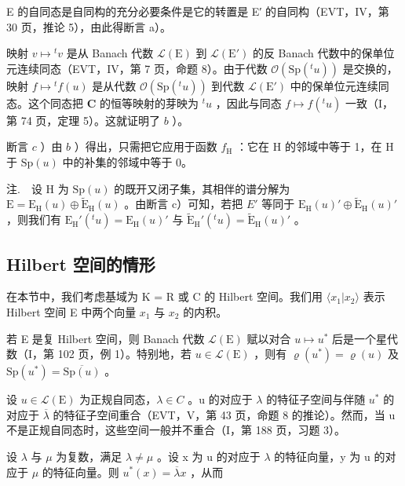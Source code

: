 E 的自同态是自同构的充分必要条件是它的转置是 E′ 的自同构（EVT，IV，第 30 页，推论 5），由此得断言 a）。

映射 \(v \mapsto {}^t v\) 是从 Banach 代数 \(\mathcal{L}(\mathrm{E})\) 到 \(\mathcal{L}(\mathrm{E}')\) 的反 Banach 代数中的保单位元连续同态（EVT，IV，第 7 页，命题 8）。由于代数 \(\mathcal{O}(\mathrm{Sp}({}^t u))\) 是交换的，映射 \(f \mapsto {}^t f(u)\) 是从代数 \(\mathcal{O}(\mathrm{Sp}({}^t u))\) 到代数 \(\mathcal{L}(\mathrm{E}')\) 中的保单位元连续同态。这个同态把 \(\mathbf{C}\) 的恒等映射的芽映为 \({}^t u\) ，因此与同态 \(f \mapsto f({}^t u)\) 一致（I，第 74 页，定理 5）。这就证明了 \(b\) ）。

断言 \(c\) ）由 \(b\) ）得出，只需把它应用于函数 \(f_{\mathrm{H}}\) ：它在 H 的邻域中等于 1，在 H 于 \(\mathrm{Sp}(u)\) 中的补集的邻域中等于 0。

注.　设 H 为 \(\mathrm{Sp}(u)\) 的既开又闭子集，其相伴的谱分解为 \(\mathrm{E} = \mathrm{E}_{\mathrm{H}}(u) \oplus \widetilde{\mathrm{E}}_{\mathrm{H}}(u)\) 。由断言 c）可知，若把 \(E'\) 等同于 \(\mathrm{E}_{\mathrm{H}}(u)' \oplus \widetilde{\mathrm{E}}_{\mathrm{H}}(u)'\) ，则我们有 \(\mathrm{E}_{\mathrm{H}}'(^{t}u) = \mathrm{E}_{\mathrm{H}}(u)'\) 与 \(\widetilde{\mathrm{E}}_{\mathrm{H}}'(^{t}u) = \widetilde{\mathrm{E}}_{\mathrm{H}}(u)'\) 。

\subsection{Hilbert 空间的情形}

在本节中，我们考虑基域为 K = R 或 C 的 Hilbert 空间。我们用 \(\langle x_{1}|x_{2}\rangle\) 表示 Hilbert 空间 E 中两个向量 \(x_{1}\) 与 \(x_{2}\) 的内积。

若 E 是复 Hilbert 空间，则 Banach 代数 \(\mathcal{L}(\mathrm{E})\) 赋以对合 \(u\mapsto u^{*}\) 后是一个星代数（I，第 102 页，例 1）。特别地，若 \(u\in \mathcal{L}(\mathrm{E})\) ，则有 \(\varrho (u^{*}) = \varrho (u)\) 及 \(\mathrm{Sp}(u^{*}) = \overline{\mathrm{Sp}(u)}\) 。

设 \(u \in \mathcal{L}(\mathrm{E})\) 为正规自同态，\(\lambda \in C\) 。u 的对应于 \(\lambda\) 的特征子空间与伴随 \(u^{*}\) 的对应于 \(\overline{\lambda}\) 的特征子空间重合（EVT，V，第 43 页，命题 8 的推论）。然而，当 u 不是正规自同态时，这些空间一般并不重合（I，第 188 页，习题 3）。

设 \(\lambda\) 与 \(\mu\) 为复数，满足 \(\lambda \neq \mu\) 。设 x 为 u 的对应于 \(\lambda\) 的特征向量，y 为 u 的对应于 \(\mu\) 的特征向量。则 \(u^{*}(x) = \overline{\lambda}x\) ，从而

